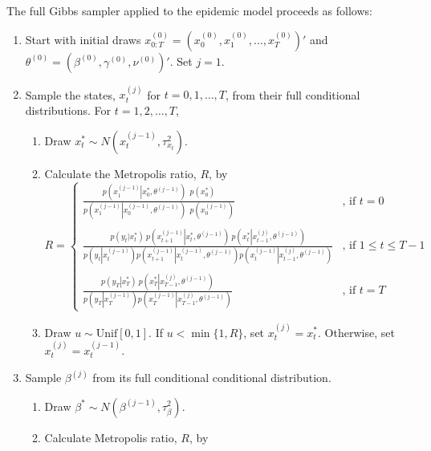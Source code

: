 The full Gibbs sampler applied to the epidemic model proceeds as follows:
\begin{enumerate}
\item Start with initial draws $x^{(0)}_{0:T} = (x^{(0)}_0, x^{(0)}_1, \ldots, x^{(0)}_T)'$ and $\theta^{(0)} = (\beta^{(0)}, \gamma^{(0)}, \nu^{(0)})'$. Set $j = 1$.
\item \label{step:gibbs} Sample the states, $x^{(j)}_t$ for $t = 0,1,\ldots,T$, from their full conditional distributions. For $t = 1, 2, \ldots, T$,
    \begin{enumerate}
    \item Draw $x^*_t \sim N(x^{(j-1)}_t,\tau^2_{x_t})$.
    \item Calculate the Metropolis ratio, $R$, by
      \[R = \left\{
      \begin{array}{cl}
      \frac{p\left(x^{(j-1)}_1\left|x^*_0,\theta^{(j-1)}\right. \right)\ \ p\left(x^*_0\right)}{p\left(x^{(j-1)}_1\left|x^{(j-1)}_0,\theta^{(j-1)}\right.\right)\ \ p\left(x^{(j-1)}_0\right)} & \mbox{, if } t = 0 \\
      & \\
      \frac{p\left(y_t|x^*_t\right)\ p\left( \left. x^{(j-1)}_{t+1} \right| x^*_t,\theta^{(j-1)}  \right)\ p\left(x^*_t \left| x^{(j)}_{t-1},\theta^{(j-1)} \right. \right)}{p\left(y_t \left|x^{(j-1)}_t \right. \right) p\left(x^{(j-1)}_{t+1}\left|x^{(j-1)}_t,\theta^{(j-1)}\right.\right) p\left(x^{(j-1)}_t\left|x^{(j)}_{t-1},\theta^{(j-1)}\right.\right)}
      & \mbox{, if } 1 \le t \le T-1 \\
      & \\
      \frac{p\left(y_T \left|x^*_T \right. \right)\  p\left(x^*_T \left|x^{(j)}_{T-1},\theta^{(j-1)} \right. \right)}{p\left(y_T \left|x^{(j-1)}_T \right. \right)p\left(x^{(j-1)}_T\left|x^{(j)}_{T-1},\theta^{(j-1)} \right. \right)} & \mbox{, if } t = T
      \end{array}
      \right.\]
    \item Draw $u \sim \mbox{Unif}[0,1]$. If $u < \min\{1, R\}$, set $x^{(j)}_t = x^*_t$. Otherwise, set $x^{(j)}_t = x^{(j-1)}_t$.
    \end{enumerate}
\item \label{step:beta} Sample $\beta^{(j)}$ from its full conditional conditional distribution.
    \begin{enumerate}
    \item Draw $\beta^* \sim N(\beta^{(j-1)},\tau^2_{\beta})$.
    \item Calculate Metropolis ratio, $R$, by

\end{enumerate}
\end{enumerate}
